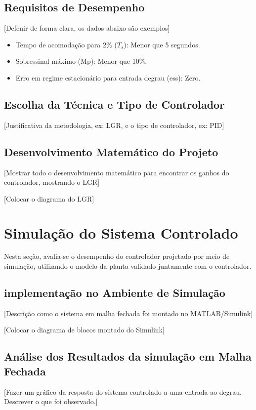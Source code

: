 \documentclass[9pt,a4paper,twocolumn,twoside]{tau-class/tau}
\begin{document}
\subsection{Requisitos de Desempenho}

[Defenir de forma clara, os dados abaixo são exemplos]

\begin{itemize}
    \item Tempo de acomodação para 2\% ($T_s$): Menor que 5 segundos.
    \item Sobressinal máximo (Mp): Menor que 10\%.
    \item Erro em regime estacionário para entrada degrau (ess): Zero.
\end{itemize}

\subsection{Escolha da Técnica e Tipo de Controlador}
[Justificativa da metodologia, ex: LGR, e o tipo de controlador, ex: PID]


\subsection{Desenvolvimento Matemático do Projeto}
[Mostrar todo o desenvolvimento matemático para encontrar os ganhos do controlador, mostrando o LGR]

[Colocar o diagrama do LGR]

\section{Simulação do Sistema Controlado}
Nesta seção, avalia-se o desempenho do controlador projetado por meio de simulação, utilizando o modelo da planta validado juntamente com o controlador.

\subsection{implementação no Ambiente de Simulação}
[Descrição como o sistema em malha fechada foi montado no MATLAB/Simulink]

[Colocar o diagrama de blocos montado do Simulink]

\subsection{Análise dos Resultados da simulação em Malha Fechada}
[Fazer um gráfico da resposta do sistema controlado a uma entrada ao degrau. Descrever o que foi observado.]
\end{document}
